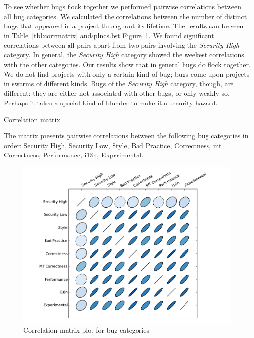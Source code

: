 \documentclass[conference]{llncs}
\begin{document}
To see whether bugs flock together we performed pairwise correlations
between all bug categories. We calculated the correlations between the
number of distinct bugs that appeared in a project throughout its
lifetime. The results can be seen in Table~\ref{tbl:corrmatrix} andsplncs.bst
Figure~\ref{fig:corrplot}. We found significant correlations between
all pairs apart from two pairs involving the {\it Security High}
category. In general, the {\it Security High} category showed the
weekest correlations with the other categories. Our results show that
in general bugs do flock together. We do not find projects with only a
certain kind of bug; bugs come upon projects in swarms of different
kinds. Bugs of the {\it Security High} category, though, are
different: they are either not associated with other bugs, or only
weakly so. Perhaps it takes a special kind of blunder to make it a
security hazard.

\begin{table}
    \centering
    \caption{Correlation matrix}
    \label{tbl:corrmatrix}
    
    \small The matrix presents pairwise correlations between the
        following bug categories in order: Security High, Security
        Low, Style, Bad Practice, Correctness, {\sc mt} Correctness,
        Performance, i18n, Experimental.
\end{table}


\begin{figure}
  \centering
  \includegraphics[scale=0.6]{corrplot.pdf}
  \caption{Correlation matrix plot for bug categories}
  \label{fig:corrplot}
\end{figure}
\end{document}
